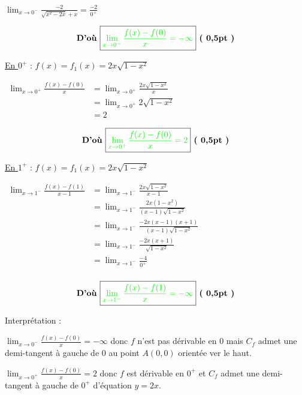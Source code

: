 \documentclass[12pt,a4paper]{article}
\begin{document}
\begin{enumerate}
$\lim_{x \to 0^{-}} \frac{ - 2}{\sqrt{x^2 - 2x}+x}=\frac{-2}{0^{+}}$

\[\textbf{D'où } \boxed{\textcolor{green}{ \lim_{x \to 0^{-}} \frac{f(x)-f(0)}{x} = -\infty }} \textbf{ ( 0,5pt )} \]

\underline{En \( 0^{+} \)} : \( f(x) = f_{1}(x) = 2x\sqrt{ 1 - x^2 } \)

$
\begin{aligned}
\lim_{x \to 0^{+}} \frac{f(x)-f(0)}{x} &= \lim_{x \to 0^{+}} \frac{2x\sqrt{ 1 - x^2 }}{x}\\
																			 &=  \lim_{x \to 0^{+}} 2\sqrt{ 1 - x^2 }\\
																			 &= 2
\end{aligned}
$

\[\textbf{D'où } \boxed{\textcolor{green}{ \lim_{x \to 0^{+}} \frac{f(x)-f(0)}{x} = 2 }} \textbf{ ( 0,5pt )} \]

\underline{En \( 1^{+} \)} : \( f(x) = f_{1}(x) = 2x\sqrt{1-x^2} \)

$
\begin{aligned}
\lim_{x \to 1^{-}} \frac{f(x)-f(1)}{x-1} &= \lim_{x \to 1^{-}} \frac{2x\sqrt{ 1 - x^2 }}{x-1}\\
																			 &=  \lim_{x \to 1^{-}} \frac{2x(1-x^{2})}{(x-1)\sqrt{ 1 - x^2 }}\\
																			 &= \lim_{x \to 1^{-}} \frac{-2x(x-1)(x+1)}{(x-1)\sqrt{ 1 - x^2 }}\\
																			 &= \lim_{x \to 1^{-}} \frac{-2x(x+1)}{\sqrt{ 1 - x^2 }}\\
																			 &= \lim_{x \to 1^{-}} \frac{-4}{0^{+}}\\
\end{aligned}
$

\[\textbf{D'où } \boxed{\textcolor{green}{ \lim_{x \to 1^{-}} \frac{f(x)-f(1)}{x} = -\infty }} \textbf{ ( 0,5pt )} \]

Interprétation : 

$ \lim_{x \to 0^{-}} \frac{f(x)-f(0)}{x} = -\infty $ donc $f$ n'est pas dérivable en $0$  mais $C_{f}$ admet une demi-tangent à gauche de $0$ au point $A(0,0)$ orientée ver le haut.

$ \lim_{x \to 0^{+}} \frac{f(x)-f(0)}{x} = 2 $ donc $f$ est dérivable en $0^{+}$  et $C_{f}$ admet une demi-tangent à gauche de $0^{+}$ d'équation $ y = 2x$.
\end{enumerate}
\end{document}
